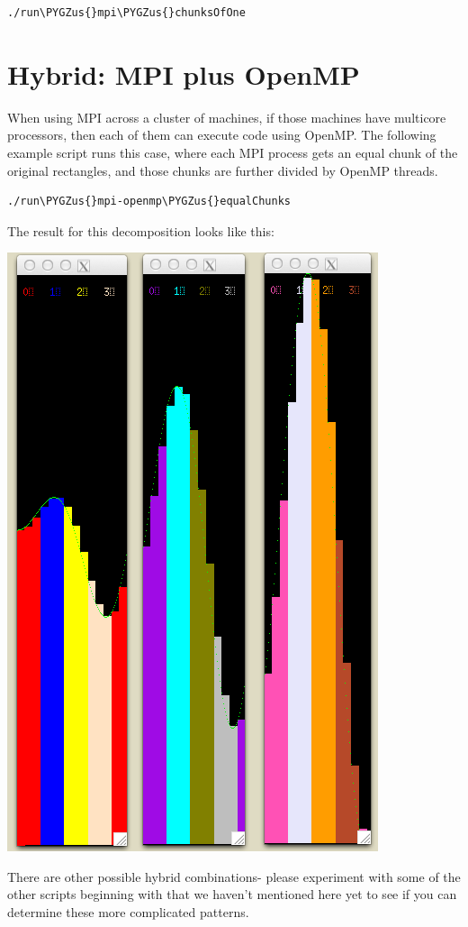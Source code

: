\documentclass[letterpaper,10pt,openany,oneside]{sphinxmanual}
\def\PYGZus{\char`\_}
\begin{document}
\begin{Verbatim}[commandchars=\\\{\}]
./run\PYGZus{}mpi\PYGZus{}chunksOfOne
\end{Verbatim}


\section{Hybrid: MPI plus OpenMP}
\label{ParallelVis:hybrid-mpi-plus-openmp}
When using MPI across a cluster of machines, if those machines have multicore processors, then each of them can execute code using OpenMP.  The following example script runs this case, where each MPI process gets an equal chunk of the original rectangles, and those chunks are further divided by OpenMP threads.

\begin{Verbatim}[commandchars=\\\{\}]
./run\PYGZus{}mpi-openmp\PYGZus{}equalChunks
\end{Verbatim}

The result for this decomposition looks like this:

\includegraphics{run_mpi-openmp_equalChunks.png}

There are other possible hybrid combinations- please experiment with some of the other scripts beginning with  that we haven't mentioned here yet to see if you can determine these more complicated patterns.



\renewcommand{\indexname}{Index}
\printindex
\end{document}
